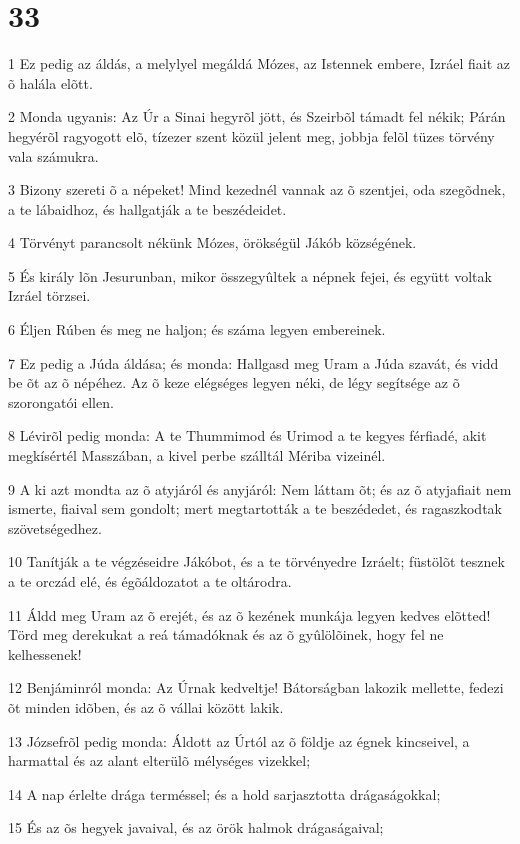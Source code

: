 \chapter{33}

\par 1 Ez pedig az áldás, a melylyel megáldá Mózes, az Istennek embere, Izráel fiait az õ halála elõtt.
\par 2 Monda ugyanis: Az Úr a Sinai hegyrõl jött, és Szeirbõl támadt fel nékik; Párán hegyérõl ragyogott elõ, tízezer szent közül jelent meg, jobbja felõl tüzes törvény vala számukra.
\par 3 Bizony szereti õ a népeket! Mind kezednél vannak az õ szentjei, oda szegõdnek, a te lábaidhoz, és hallgatják a te beszédeidet.
\par 4 Törvényt parancsolt nékünk Mózes, örökségül  Jákób községének.
\par 5 És király lõn Jesurunban, mikor összegyûltek a népnek fejei, és együtt voltak Izráel törzsei.
\par 6 Éljen Rúben és meg ne haljon; és száma legyen embereinek.
\par 7 Ez pedig a Júda áldása; és monda: Hallgasd meg Uram a Júda szavát, és vidd be õt az õ népéhez. Az õ keze elégséges legyen néki, de légy segítsége az õ szorongatói ellen.
\par 8 Lévirõl pedig monda: A te Thummimod és Urimod a te kegyes férfiadé, akit megkísértél Masszában, a kivel perbe szálltál Mériba vizeinél.
\par 9 A ki azt mondta az õ atyjáról és anyjáról: Nem láttam õt; és az õ atyjafiait nem ismerte, fiaival sem gondolt; mert megtartották a te beszédedet, és ragaszkodtak szövetségedhez.
\par 10 Tanítják a te végzéseidre Jákóbot, és a te törvényedre Izráelt; füstölõt tesznek a te orczád elé, és égõáldozatot a te oltárodra.
\par 11 Áldd meg Uram az õ erejét, és az õ kezének munkája legyen kedves elõtted! Törd meg derekukat a reá támadóknak és az õ gyûlölõinek, hogy fel ne kelhessenek!
\par 12 Benjáminról monda: Az Úrnak kedveltje! Bátorságban lakozik mellette, fedezi õt minden idõben, és az õ vállai között lakik.
\par 13 Józsefrõl pedig monda: Áldott az Úrtól az õ földje az égnek kincseivel, a harmattal és az alant elterülõ mélységes vizekkel;
\par 14 A nap érlelte drága terméssel; és a hold sarjasztotta drágaságokkal;
\par 15 És az õs hegyek javaival, és az örök halmok drágaságaival;
